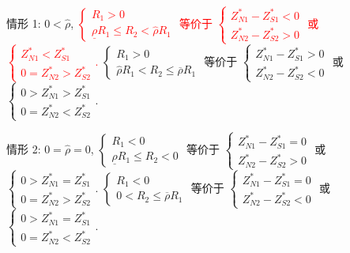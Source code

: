 \documentclass[10.0pt]{article}
\newcommand{\hhred}{\textcolor{red}}
\begin{document}
情形 1: $ 0 < {\hat \rho} $, \hhred{$ \left\{ \begin{matrix} R_1 > 0 \\ \underline{\rho} R_1 \leqslant R_2 < {\hat \rho} R_1 \end{matrix} \right. $ 等价于 $ \left\{ \begin{matrix} Z_{N 1}^* - Z_{S 1}^* < 0 \\ Z_{N 2}^* - Z_{S 2}^* > 0 \end{matrix} \right. $ 或 $ \left\{ \begin{matrix} Z_{N 1}^* < Z_{S 1}^* \\ 0 = Z_{N 2}^* > Z_{S 2}^* \end{matrix} \right. $.}
$ \left\{ \begin{matrix} R_1 > 0 \\ {\hat \rho} R_1 < R_2 \leqslant \overline{\rho} R_1 \end{matrix} \right. $ 等价于 $ \left\{ \begin{matrix} Z_{N 1}^* - Z_{S 1}^* > 0 \\ Z_{N 2}^* - Z_{S 2}^* < 0 \end{matrix} \right. $ 或 $ \left\{ \begin{matrix} 0 > Z_{N 1}^* > Z_{S 1}^* \\ 0 = Z_{N 2}^* < Z_{S 2}^* \end{matrix} \right. $.

情形 2: $ 0 = {\hat \rho} = 0 $, $ \left\{ \begin{matrix} R_1 < 0 \\ \underline{\rho} R_1 \leqslant R_2 < 0 \end{matrix} \right. $ 等价于 $ \left\{ \begin{matrix} Z_{N 1}^* - Z_{S 1}^* = 0 \\ Z_{N 2}^* - Z_{S 2}^* > 0 \end{matrix} \right. $ 或 $ \left\{ \begin{matrix} 0 > Z_{N 1}^* = Z_{S 1}^* \\ 0 = Z_{N 2}^* > Z_{S 2}^* \end{matrix} \right. $.
$ \left\{ \begin{matrix} R_1 < 0 \\ 0 < R_2 \leqslant \overline{\rho} R_1 \end{matrix} \right. $ 等价于 $ \left\{ \begin{matrix} Z_{N 1}^* - Z_{S 1}^* = 0 \\ Z_{N 2}^* - Z_{S 2}^* < 0 \end{matrix} \right. $ 或 $ \left\{ \begin{matrix} 0 > Z_{N 1}^* = Z_{S 1}^* \\ 0 = Z_{N 2}^* < Z_{S 2}^* \end{matrix} \right. $.
\end{document}
